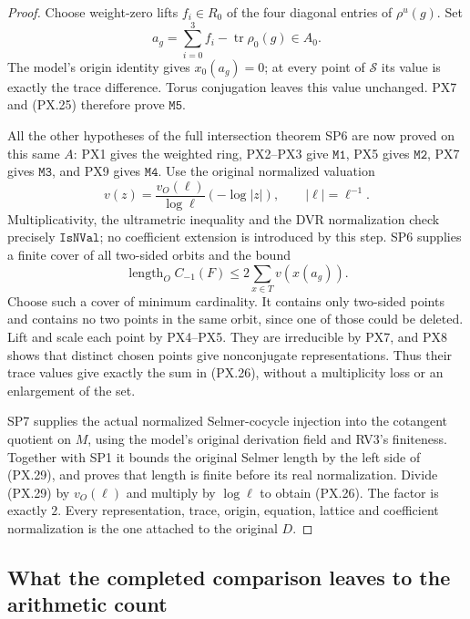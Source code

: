 \begin{proof}
Choose weight-zero lifts $f_i\in R_0$ of the
four diagonal entries of $\rho^u(g)$.  Set
\[
           a_g=\sum_{i=0}^3 f_i
                       -\operatorname{tr}\rho_0(g)\in A_0.
 \tag{PX.27}
\]
The model's origin identity gives $x_0(a_g)=0$;
at every point of $\mathcal S$ its value is
exactly the trace difference.  Torus
conjugation leaves this value unchanged.
PX7 and (PX.25) therefore prove $\mathtt{M5}$.

All the other hypotheses of the full
intersection theorem SP6 are now proved
on this same $A$: PX1 gives the weighted
ring, PX2--PX3 give $\mathtt{M1}$, PX5
gives $\mathtt{M2}$, PX7 gives
$\mathtt{M3}$, and PX9 gives
$\mathtt{M4}$.  Use the original
normalized valuation
\[
 v(z)=\frac{v_O(\ell)}{\log\ell}(-\log|z|),
                  \qquad |\ell|=\ell^{-1}.
 \tag{PX.28}
\]
Multiplicativity, the ultrametric inequality
and the DVR normalization check precisely
$\mathtt{IsNVal}$; no coefficient
extension is introduced by this step.
SP6 supplies a finite cover of all
two-sided orbits and the bound
\[
 \operatorname{length}_O C_{-1}(F)
                       \le2\sum_{x\in T}v(x(a_g)).
 \tag{PX.29}
\]
Choose such a cover of minimum cardinality.
It contains only two-sided points and
contains no two points in the same orbit,
since one of those could be deleted.
Lift and scale each point by PX4--PX5.
They are irreducible by PX7, and PX8
shows that distinct chosen points give
nonconjugate representations.  Thus
their trace values give exactly the
sum in (PX.26), without a multiplicity
loss or an enlargement of the set.

SP7 supplies the actual normalized
Selmer-cocycle injection into the
cotangent quotient on $M$, using
the model's original derivation
field and RV3's finiteness.  Together
with SP1 it bounds the original
Selmer length by the left side of
(PX.29), and proves that length is
finite before its real normalization.
Divide (PX.29) by $v_O(\ell)$ and
multiply by $\log\ell$ to obtain
(PX.26).  The factor is exactly
$2$.  Every representation, trace,
origin, equation, lattice and
coefficient normalization is the
one attached to the original $D$.
\end{proof}

\subsection{What the completed comparison leaves to the arithmetic count}

